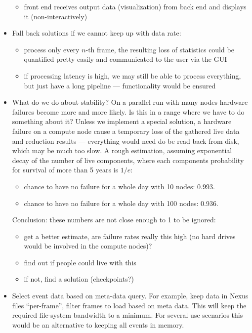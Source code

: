 \documentclass[a4paper,english,numbers=noenddot,bibliography=totoc,chapterprefix=on,DIV=12]{scrartcl}
\begin{document}
\begin{itemize}
\begin{itemize}
            \item front end receives output data (visualization) from back end and displays it (non-interactively)
        \end{itemize}
    \item Fall back solutions if we cannot keep up with data rate:
        \begin{itemize}
            \item process only every $n$-th frame, the resulting loss of statistics could be quantified pretty easily and communicated to the user via the GUI
            \item if processing latency is high, we may still be able to process everything, but just have a long pipeline --- functionality would be ensured
        \end{itemize}
    \item What do we do about stability?
        On a parallel run with many nodes hardware failures become more and more likely.
        Is this in a range where we have to do something about it?
        Unless we implement a special solution, a hardware failure on a compute node cause a temporary loss of the gathered live data and reduction results --- everything would need do be read back from disk, which may be much too slow.
        A rough estimation, assuming exponential decay of the number of live components, where each components probability for survival of more than 5 years is $1/e$:
        \begin{itemize}
            \item chance to have no failure for a whole day with 10 nodes: 0.993.
            \item chance to have no failure for a whole day with 100 nodes: 0.936.
        \end{itemize}
        Conclusion: these numbers are not close enough to 1 to be ignored:
        \begin{itemize}
            \item get a better estimate, are failure rates really this high (no hard drives would be involved in the compute nodes)?
            \item find out if people could live with this
            \item if not, find a solution (checkpoints?)
        \end{itemize}
    \item Select event data based on meta-data query.
        For example, keep data in Nexus files ``per-frame'', filter frames to load based on meta data.
        This will keep the required file-system bandwidth to a minimum.
        For several use scenarios this would be an alternative to keeping all events in memory.
\end{itemize}
\end{document}
